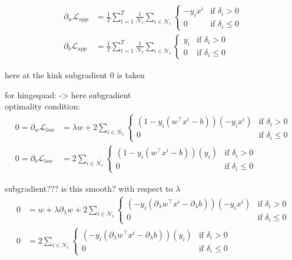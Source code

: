 \begin{align}
	\partial_{w}\mathcal{L}_{upp}&= \frac{1}{T}\sum_{t=1}^T\frac{1}{\mathcal{N}_t}\sum_{i \in \mathcal{N}_t}{\left\{\begin{array}{cl} -y_ix^i & \text{if } \delta_i >0 \\ 0 & \text{if } \delta_i \leq 0 \end{array} \right.} \\
	\partial_{b}\mathcal{L}_{upp}&= \frac{1}{T}\sum_{t=1}^T\frac{1}{\mathcal{N}_t}\sum_{i \in \mathcal{N}_t}{\left\{\begin{array}{cl} y_i & \text{if } \delta_i >0 \\ 0 & \text{if } \delta_i \leq 0 \end{array} \right.}
	\end{align}
	
	here at the kink subgradient 0 is taken

for hingequad: -> here subgradient \\
optimality condition:
\begin{align}
	0 = \partial_{w}\mathcal{L}_{low} &= \lambda w+2\sum_{i \in \bar{\mathcal{N}_t}}{\left\{\begin{array}{cl} (1-y_i(w^{\top}x^i-b))(-y_ix^i) & \text{if } \delta_i >0 \\ 0 & \text{if } \delta_i \leq 0 \end{array} \right.} \\
	0 = \partial_b\mathcal{L}_{low} &= 2\sum_{i \in \bar{\mathcal{N}_t}}{\left\{\begin{array}{cl} (1-y_i(w^{\top}x^i-b))(y_i) & \text{if } \delta_i >0 \\ 0 & \text{if } \delta_i \leq 0 \end{array} \right.}
	\end{align}
	
subgradient??? is this smooth? with respect to \(\lambda\)
\begin{align}
	0 &= w+\lambda\partial_{\lambda}w+2\sum_{i \in \bar{\mathcal{N}_t}}{\left\{\begin{array}{cl} (-y_i(\partial_{\lambda}w^{\top}x^i-\partial_{\lambda}b))(-y_ix^i) & \text{if } \delta_i >0 \\ 0 & \text{if } \delta_i \leq 0 \end{array} \right.} \\
	0 &= 2\sum_{i \in \bar{\mathcal{N}_t}}{\left\{\begin{array}{cl} (-y_i(\partial_{\lambda}w^{\top}x^i-\partial_{\lambda}b))(y_i) & \text{if } \delta_i >0 \\ 0 & \text{if } \delta_i \leq 0 \end{array} \right.}
\end{align}

